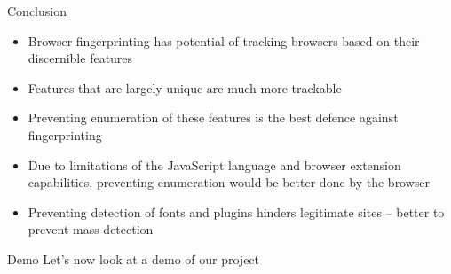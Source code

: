\begin{frame}[fragile,t]{Conclusion}
	\begin{itemize}
		\item Browser fingerprinting has potential of tracking browsers based on their discernible features
		\item Features that are largely unique are much more trackable
		\item Preventing enumeration of these features is the best defence against fingerprinting
		\item Due to limitations of the JavaScript language and browser extension capabilities, preventing enumeration would be better done by the browser
		\item Preventing detection of fonts and plugins hinders legitimate sites -- better to prevent mass detection
	\end{itemize}
\end{frame}

\begin{frame}[plain]
	\begin{block}{Demo}
		Let's now look at a demo of our project
	\end{block}
\end{frame}
\addtocounter{framenumber}{-1}

